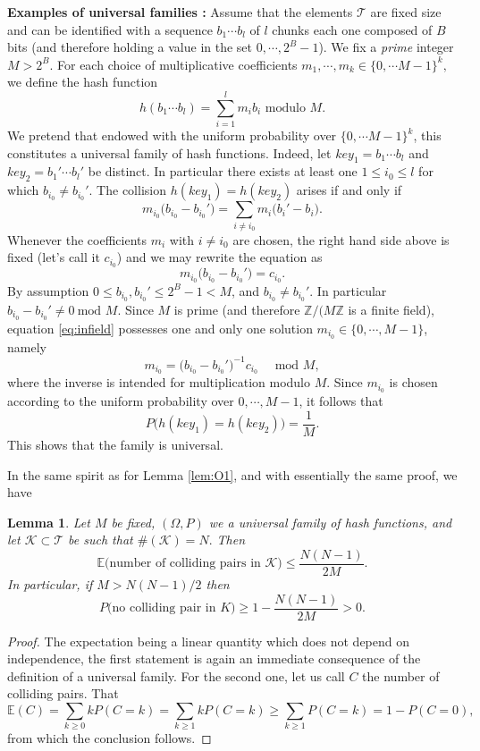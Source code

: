 \documentclass[12pt]{article}
\theoremstyle{plain}
\newtheorem{lemma}{Lemma}
\theoremstyle{remark}
\begin{document}
\medskip
{\bf Examples of universal families :}
Assume that the elements $\mathcal{T}$ are fixed size and can be identified with  
a sequence $b_1 \cdots b_l$ of $l$ chunks each one composed of $B$ bits (and
therefore holding a value in the set $0,\cdots, 2^{B}- 1$). We fix a {\it prime} integer
$M > 2^B$. For each choice of multiplicative coefficients $m_1, \cdots, 
m_k \in \{0, \cdots M - 1\}^k,$ we define the hash function 
$$
h(b_1\cdots b_l) = \sum_{i=1}^l m_ib_i \text{ modulo } M.
$$
We pretend that endowed with the uniform probability over $\{0, \cdots M -
1\}^k$, this constitutes a universal family of hash functions. Indeed, let
$key_1 = b_1\cdots b_l$ and $key_2 = b_1'\cdots b_l'$ be distinct. In particular
there exists at least one $1 \leq i_0 \leq l$ for which $b_{i_0} \neq b_{i_0}'.$
The collision $h(key_1) = h(key_2)$ arises if and only if
$$
m_{i_0}\Big(b_{i_0} - b_{i_0}' \Big) = \sum_{i \neq i_0} m_i \Big(b_{i}' -
b_{i} \Big).
$$
Whenever the coefficients $m_i$ with $i \neq i_0$ are chosen, the right hand
side above is fixed (let's call it $c_{i_0}$) and we may rewrite the equation as
\begin{equation}\label{eq:infield}
m_{i_0}\Big(b_{i_0} - b_{i_0}' \Big) = c_{i_0}.
\end{equation}
By assumption $0 \leq b_{i_0}, b_{i_0}' \leq 2^{B} - 1 < M$, and $b_{i_0} \neq
b_{i_0}'.$ In particular $b_{i_0} - b_{i_0}' \neq 0 \ \text{mod } M.$ Since 
$M$ is prime (and therefore $\mathbb{Z}/(M\mathbb{Z}$ is a finite field),
equation \eqref{eq:infield} possesses one and only one solution $m_{i_0} \in
\{0, \cdots, M-1\}$, namely
$$
m_{i_0} = \Big(b_{i_0} - b_{i_0}' \Big)^{-1} c_{i_0}\quad \text{ mod } M, 
$$
where the inverse is intended for multiplication modulo $M.$ Since $m_{i_0}$ 
is chosen according to the uniform probability over $0,\cdots, M-1$, it follows
that
$$
P\Big( h(key_1)= h(key_2)\Big) = \frac{1}{M}.
$$
This shows that the family is universal. 


\medskip

In the same spirit as for Lemma  \ref{lem:O1}, and with essentially the same
proof, we have

\begin{lemma}
	Let $M$ be fixed, $(\Omega,P)$ we a universal family of hash functions,
	and let $\mathcal{K} \subset \mathcal{T}$ be such that $\#(\mathcal{K})
	= N.$ Then
	$$
	\mathbb{E}\Big(\text{number of colliding pairs in } \mathcal{K} \Big)
	\leq \frac{N(N-1)}{2M}.
	$$
	In particular, if $M > N(N-1)/2$ then
	$$
	P\Big(\text{no colliding pair in } K\Big) \geq 1 - \frac{N(N-1)}{2M} > 0.
	$$
\end{lemma}
\begin{proof}
The expectation being a linear quantity which does not depend on independence,
the first statement is again an immediate consequence of the definition of a
universal family. For the second one, let us call $C$ the number of colliding
pairs. That
$$
	\mathbb{E}(C) = \sum_{k \geq 0} k P(C = k) = \sum_{k \geq 1} k P(C = k)
	\geq \sum_{k \geq 1} P(C = k) = 1 - P(C = 0),
$$
from which the conclusion follows.
\end{proof}
\end{document}
